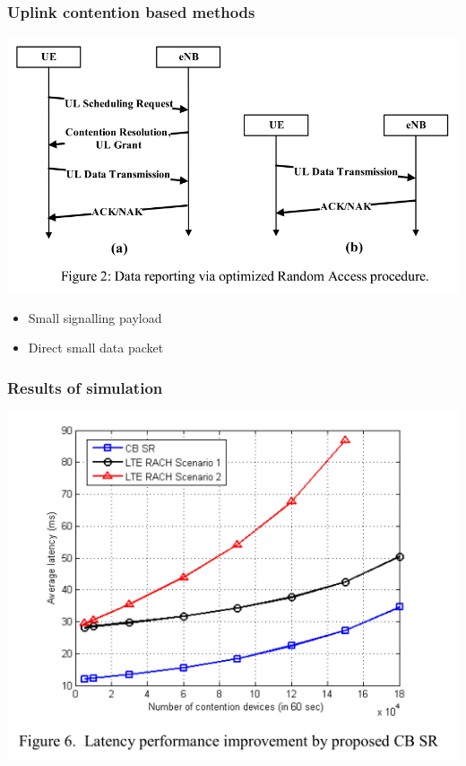 \documentclass[a4paper,11pt,handout]{beamer}
\begin{document}
\begin{frame}
	\frametitle{Uplink contention based methods}


	\begin{center}
	\includegraphics[scale=0.3]{uc.png}
	\end{center}

	\begin{itemize}
		\item Small signalling payload
		\item Direct small data packet
	\end{itemize}
\end{frame}
\note{}
\begin{frame}
	\frametitle{Results of simulation}

	\begin{center}
	\includegraphics[scale=0.4]{cb-latency.png}
	\end{center}

\end{frame}
\end{document}
